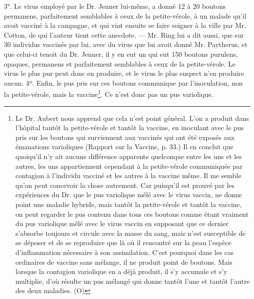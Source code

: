 3°. Le virus employé par le Dr. Jenner lui-même, a donné 12 à 20 boutons permanens,\setcounter{page}{369} parfaitement semblables à ceux de la petite-vérole, à un malade qu'il avoit vacciné à la campagne, et qui vint ensuite se faire soigner à la ville par Mr. Cotton, de qui l'auteur tient cette anecdote. — Mr. Ring lui a dit aussi, que sur 30 individus vaccinés par lui, avec du virus que lui avoit donné Mr. Paytherus, et que celui-ci tenoit du Dr. Jenner, il y en eut un qui eut 150 boutons purulens, opaques, permanens et parfaitement semblables à ceux de la petite-vérole. Le virus le plus pur peut donc en produire, et le virus le plus suspect n'en produire aucun.
4º. Enfin, le pus pris sur ces boutons communique par l'inoculation, non la petite-vérole, mais la vaccine\footnote{Le Dr. Aubert nous apprend que cela n'est point général. L'on a produit dans l'hôpital tantôt la petite-vérole et tantôt la vaccine, en inoculant avec le pus pris sur les boutons qui surviennent aux vaccinés qui ont été exposés aux émanations varioliques (Rapport sur la Vaccine, p. 33.) Il en conclut que quoiqu'il n'y ait aucune différence apparente quelconque entre les uns et les autres, les uns appartiennent cependant à la petite-vérole communiquée par contagion à l'individu vacciné et les autres à la vaccine même. Il me semble qu'on peut concevoir la chose autrement. Car puisqu'il est prouvé par les expériences du Dr. que le pus variolique mêlé avec le virus vaccin, ne donne point une maladie hybride, mais tantôt la petite-vérole et tantôt la vaccine, on peut regarder le pus contenu dans tous ces boutons comme étant vraiment du pus variolique mêlé avec le virus vaccin en supposant que ce dernier s'absorbe toujours et circule avec la masse du sang, mais n'est susceptible de se déposer et de se reproduire que là où il rencontré sur la peau l'espèce d'inflammation nécessaire à son assimilation. C'est pourquoi dans les cas ordinaires de vaccine sans mélange, il ne produit point de boutons. Mais lorsque la contagion variolique en a déjà produit, il s'y accumule et s'y multiplie, d'où résulte un pus mélangé qui donne tantôt l'une et tantôt l'autre des deux maladies. (O)}. Ce n'est donc pas un pus variolique.
\setcounter{page}{370}
